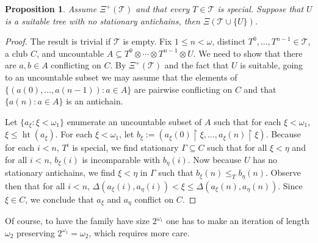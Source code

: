 \documentclass[a4paper,noamsfonts]{amsart}
\newtheorem{proposition}[theorem]{Proposition}
\theoremstyle{definition}
\newcommand{\seb}{\subseteq}
\newcommand{\res}{\!\upharpoonright\!}
\newcommand{\1}{\mathbbm{1}}
\newcommand{\T}{\mathcal{T}}
\newcommand{\prop}{\Xi}
\newcommand{\propp}{\prop^{+}}
\DeclareMathOperator{\hht}{ht}
\begin{document}
\begin{proposition}
  Assume $\propp(\T)$ and that every $T \in \T$ is special.
  Suppose that $U$ is
  a suitable tree with no stationary antichains, then $\prop(\T \cup \{U\})$.
\end{proposition}
\begin{proof}
  The result is trivial if $\T$ is empty. Fix $1 \le n < \omega$,
  distinct $T^{0},\dots,T^{n-1} \in \T$, a club $C$,
  and uncountable
  $A \seb T^{0}\otimes \cdots \otimes T^{n-1} \otimes U$. We need to
  show that there are $a,b \in A$ conflicting on $C$.
  By $\propp(\T)$ and the fact that $U$ is suitable, going to an uncountable
  subset we may assume that the elements of $\{(a(0),\dots,a(n-1)) : a \in A\}$
  are pairwise conflicting on $C$ and that $\{a(n) : a \in A\}$ is an antichain.

  Let $\{a_{\xi} : \xi < \omega_{1}\}$
  enumerate an uncountable subset of $A$ such that
  for each $\xi < \omega_{1}$, $\xi \le \hht(a_{\xi})$.
  For each $\xi < \omega_{1}$, let $b_{\xi} := (a_{\xi}(0)\res \xi,\dots,
  a_{\xi}(n)\res \xi)$. Because for each $i < n$, $T^{i}$ is special,
  we find stationary $\Gamma \seb C$ such that for all
  $\xi < \eta$ and for all $i < n$, $b_{\xi}(i)$ is incomparable
  with $b_{\eta}(i)$. Now because $U$ has no stationary antichains,
  we find $\xi < \eta$ in $\Gamma$ such that
  $b_{\xi}(n) \le_{T} b_{\eta}(n)$. Observe then
  that for all $i < n$,
  $\Delta(a_{\xi}(i),a_{\eta}(i)) < \xi \le \Delta(a_{\xi}(n),a_{\eta}(n))$.
  Since $\xi \in C$, we conclude that $a_{\xi}$ and $a_{\eta}$ conflict on $C$.
\end{proof}

Of course, to have the family have size $2^{\omega_{1}}$ one has to make
an iteration of length $\omega_{2}$ preserving $2^{\omega_{1}} = \omega_{2}$,
which requires more care.
\end{document}
